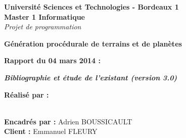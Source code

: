 \documentclass [a4paper,12pt,utf8]{report}
\begin{document}
\begin{titlepage}
\begin{center}
{\bf Université Sciences et Technologies - Bordeaux 1} \vspace{0.5cm}\\

{\bf {\large Master 1 Informatique}}\\
{ \emph{Projet de programmation}}\\\vspace{5cm}



{\huge{\bf Génération procédurale de terrains et de planètes}}\\\vspace{1cm}

{\large{\bf{Rapport du 04 mars 2014 :}}}\vspace{1cm}

{\large\bf\it\rm Bibliographie et étude de l'existant (version 3.0)
}\vspace{2cm}


\end{center}


\hspace{1cm}\textbf{Réalisé par :}

\hspace{1cm}{Simon CAULE}

\hspace{1cm}{Pierre HUCHANT}

\hspace{1cm}{Solène JOLLY}

\hspace{1cm}{Adrien LAMOUREUX}\\


\hspace{1cm}\textbf{Encadrés par :} Adrien BOUSSICAULT\\

\hspace{1cm}\textbf{Client :} Emmanuel FLEURY\\

\end{titlepage}

\tableofcontents






\end{document}
